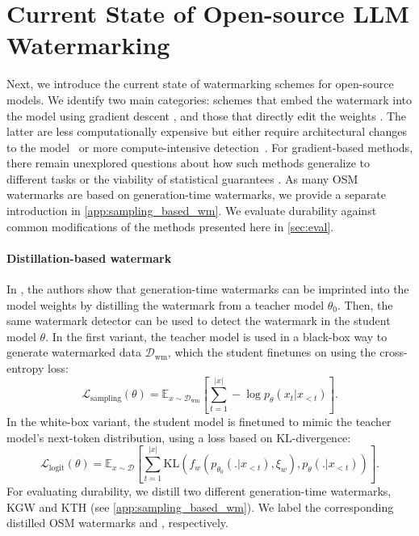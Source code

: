 
\section{Current State of Open-source LLM Watermarking} \label{sec:methods}

Next, we introduce the current state of watermarking schemes for open-source models. 
We identify two main categories: schemes that embed the watermark into the model using gradient descent \citep{learnability,rlwatermark}, and those that directly edit the weights \citep{gaussmark, unremovable}.
The latter are less computationally expensive but either require architectural changes to the model~\citep{unremovable} or more compute-intensive detection~\citep{gaussmark}.
For gradient-based methods, there remain unexplored questions about how such methods generalize to different tasks \citep{wapiti} or the viability of statistical guarantees \citep{rlwatermark}. 
As many OSM watermarks are based on generation-time watermarks, we provide a separate introduction in \cref{app:sampling_based_wm}.
We evaluate durability against common modifications of the methods presented here in \cref{sec:eval}.

\paragraph{Distillation-based watermark}
In \citet{learnability}, the authors show that generation-time watermarks \citep{kgw,aar, stanford} can be imprinted into the model weights by distilling the watermark from a teacher model $\theta_0$.
Then, the same watermark detector can be used to detect the watermark in the student model $\theta$.
In the first variant, the teacher model is used in a black-box way to generate watermarked data $\mathcal{D}_{\text{wm}}$, which the student finetunes on using the cross-entropy loss:
\begin{equation}
 \mathcal{L}_{\text{sampling}} (\theta) = \mathbb{E}_{x \sim \mathcal{D}_{\text{wm}}} \left[ \sum_{t=1}^{|x|} -\log p_\theta (x_t | x_{<t}) \right].
\end{equation}
In the white-box variant, the student model is finetuned to mimic the teacher model's next-token distribution, using a loss based on $\text{KL}$-divergence:
\begin{equation}
    \label{eq:distillation_learnability}
 \mathcal{L}_{\text{logit}} (\theta) = \mathbb{E}_{x \sim \mathcal{D}} \left[ \sum_{t=1}^{|x|} \text{KL}(f_w(p_{\theta_0}(.|x_{<t}), \xi_w), p_{\theta}(.|x_{<t})) \right].
\end{equation} 
For evaluating durability, we distill two different generation-time watermarks, \textsc{KGW} and \textsc{KTH} (see \cref{app:sampling_based_wm}).  
We label the corresponding distilled OSM watermarks \KGW and \KTH, respectively.

